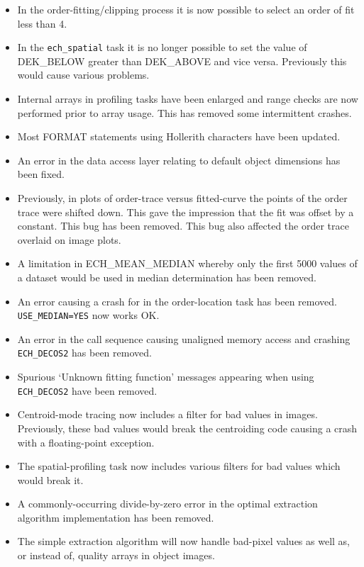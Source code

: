 \documentclass[twoside,11pt,nolof]{starlink}
\begin{document}
\begin{itemize}
\item In the order-fitting/clipping process it is now possible to
   select an order of fit less than 4.
\item In the {\tt ech\_spatial} task it is no longer possible to set the
   value of DEK\_BELOW greater than DEK\_ABOVE and vice versa.
   Previously this would cause various problems.
\item Internal arrays in profiling tasks have been enlarged and
   range checks are now performed prior to array usage.  This
   has removed some intermittent crashes.
\item Most FORMAT statements using Hollerith characters have been updated.
\item An error in the data access layer relating to default object
   dimensions has been fixed.
\item Previously, in plots of order-trace versus fitted-curve the points
   of the order trace were shifted down.  This gave the impression that
   the fit was offset by a constant.  This bug has been removed.
   This bug also affected the order trace overlaid on image plots.
\item A limitation in ECH\_MEAN\_MEDIAN whereby only the first 5000 values of
   a dataset would be used in median determination has been removed.
\item An error causing a crash for
    in the order-location
   task has been removed.  {\tt USE\_MEDIAN=YES} now works OK.
\item An error in the call sequence causing unaligned memory access and
   crashing {\tt ECH\_DECOS2} has been removed.
\item Spurious `Unknown fitting function' messages appearing when using
   {\tt ECH\_DECOS2} have been removed.
\item Centroid-mode tracing now includes a filter for bad values in images.
   Previously, these bad values would break the centroiding code causing
   a crash with a floating-point exception.
\item The spatial-profiling task now includes various filters for bad
   values which would break it.
\item A commonly-occurring divide-by-zero error in the optimal extraction
   algorithm implementation has been removed.
\item The simple extraction algorithm will now handle bad-pixel values as
   well as, or instead of, quality arrays in object images.

\end{itemize}
\end{document}

